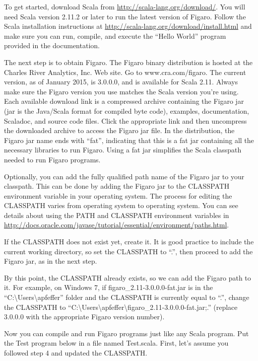 \documentclass[]{article}
\begin{document}
To get started, download Scala from
\url{http://scala-lang.org/download/}. You will need Scala version
2.11.2 or later to run the latest version of Figaro. Follow the Scala
installation instructions at
\url{http://scala-lang.org/download/install.html} and make sure you can
run, compile, and execute the ``Hello World'' program provided in the
documentation.

The next step is to obtain Figaro. The Figaro binary distribution is
hosted at the Charles River Analytics, Inc. Web site. Go to
www.cra.com/figaro. The current version, as of January 2015, is 3.0.0.0,
and is available for Scala 2.11. Always make sure the Figaro version you
use matches the Scala version you're using. Each available download link
is a compressed archive containing the Figaro jar (jar is the Java/Scala
format for compiled byte code), examples, documentation, Scaladoc, and
source code files. Click the appropriate link and then uncompress the
downloaded archive to access the Figaro jar file. In the distribution,
the Figaro jar name ends with ``fat'', indicating that this is a fat jar
containing all the necessary libraries to run Figaro. Using a fat jar
simplifies the Scala classpath needed to run Figaro programs.

Optionally, you can add the fully qualified path name of the Figaro jar
to your classpath. This can be done by adding the Figaro jar to the
CLASSPATH environment variable in your operating system. The process for
editing the CLASSPATH varies from operating system to operating system.
You can see details about using the PATH and CLASSPATH environment
variables in
\url{http://docs.oracle.com/javase/tutorial/essential/environment/paths.html}.

If the CLASSPATH does not exist yet, create it. It is good practice to
include the current working directory, so set the CLASSPATH to ``.'',
then proceed to add the Figaro jar, as in the next step.

By this point, the CLASSPATH already exists, so we can add the Figaro
path to it. For example, on Windows 7, if figaro\_2.11-3.0.0.0-fat.jar
is in the ``C:\textbackslash{}Users\textbackslash{}apfeffer'' folder and
the CLASSPATH is currently equal to ``.'', change the CLASSPATH to
``C:\textbackslash{}Users\textbackslash{}apfeffer\textbackslash{}figaro\_2.11-3.0.0.0-fat.jar;.''
(replace 3.0.0.0 with the appropriate Figaro version number).

Now you can compile and run Figaro programs just like any Scala program.
Put the Test program below in a file named Test.scala. First, let's
assume you followed step 4 and updated the CLASSPATH.
\end{document}
